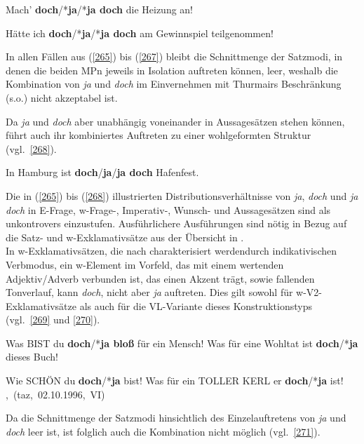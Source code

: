 \begin{exe}
	\ex\label{266} 
	Mach' \textbf{doch}/*\textbf{ja}/*\textbf{ja doch} die Heizung an!
\end{exe}
	
\begin{exe}
	\ex\label{267} 
	Hätte ich \textbf{doch}/*\textbf{ja}/*\textbf{ja doch} am Gewinnspiel teilgenommen!
\end{exe}
In allen Fällen aus (\ref{265}) bis (\ref{267}) bleibt die Schnittmenge der Satzmodi, in denen die beiden MPn jeweils in Isolation auftreten können, leer, weshalb die Kombination von \textit{ja} und \textit{doch} im Einvernehmen mit Thurmairs Beschränkung (s.o.) nicht akzep\-tabel ist.

Da \textit{ja} und \textit{doch} aber unabhängig voneinander in Aussagesätzen stehen können, führt auch ihr kombiniertes Auftreten zu einer wohlgeformten Struktur (vgl.\ \ref{268}).

\begin{exe}
	\ex\label{268} 
	In Hamburg ist \textbf{doch}/\textbf{ja}/\textbf{ja doch} Hafenfest.
\end{exe}
Die in (\ref{265}) bis (\ref{268}) illustrierten Distributionsverhältnisse von \textit{ja}, \textit{doch} und \textit{ja doch} in E-Frage, w-Frage-, Imperativ-, Wunsch- und Aussagesätzen sind als unkontrovers einzustufen. Ausführlichere Ausführungen sind nötig in Bezug auf die Satz- und w-Exklamativsätze aus der Übersicht in .\\

\noindent
In w-Exklamativsätzen,  die nach \citet[45]{Thurmair1989} charakterisiert werden\linebreak durch indikativischen Verbmodus, ein w-Element im Vorfeld, das mit einem wertenden Adjektiv/Adverb verbunden ist, das einen Akzent trägt, sowie fallenden Tonverlauf, kann \textit{doch}, nicht aber \textit{ja} auftreten. Dies gilt sowohl für w-V2-Ex\-kla\-ma\-tiv\-sätze als auch für die VL-Variante dieses Konstruktionstyps (vgl.\ \ref{269} und \ref{270}).

\begin{exe}
	\ex\label{269} 
		\begin{xlist}	
			\ex\label{269a} Was BIST du \textbf{doch}/*\textbf{ja bloß} für ein Mensch!
			\ex\label{269b} Was für eine Wohltat ist \textbf{doch}/*\textbf{ja} dieses Buch!
		\end{xlist}
\end{exe}

\begin{exe}
	\ex\label{270} 
		\begin{xlist}	
			\ex\label{270a} Wie SCHÖN du \textbf{doch}/*\textbf{ja} bist!	
			\hfill\hbox{\citet[218--219]{Rinas2006}}
			\ex\label{270b} Was für ein TOLLER KERL er \textbf{doch}/*\textbf{ja} ist!
			\newline
			\hbox{}\hfill\hbox{\citet[37]{Kwon2005}, (taz, 02.10.1996, VI)}
		\end{xlist}
\end{exe}
Da die Schnittmenge der Satzmodi hinsichtlich des Einzelauftretens von \textit{ja} und \textit{doch} leer ist, ist folglich auch die Kombination nicht möglich (vgl.\ \ref{271}).


